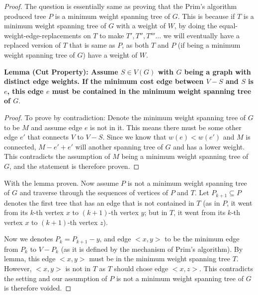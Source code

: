 \documentclass[11pt]{article}
\begin{document}
\begin{proof}

The question is essentially same as proving that the Prim's algorithm produced tree $P$ is a minimum weight spanning tree of $G$. This is because if $T$ is a minimum weight spanning tree of $G$ with a weight of $W$, by doing the equal-weight-edge-replacements on $T$ to make $T', T'', T'''$... we will eventually have a replaced version of $T$ that is same as $P$, as both $T$ and $P$ (if being a minimum weight spanning tree of $G$) have a weight of $W$.

\leavevmode\newline


    \begin{adjustwidth}{1cm}{}

    \textbf{Lemma (Cut Property): Assume $S \in V(G)$ with $G$ being a graph with distinct edge weights. If the minimum cost edge between $V-S$ and $S$ is $e$, this edge $e$ must be contained in the minimum weight spanning tree of $G$}.\newline
    \begin{proof}
    To prove by contradiction: Denote the minimum weight spanning tree of $G$ to be $M$ and assume edge $e$ is not in it. This means there must be some other edge $e'$ that connects $V$ to $V-S$. Since we know that $w(e) < w(e')$ and $M$ is connected, $M - e' + e'$ will another spanning tree of $G$ and has a lower weight. This contradicts the assumption of $M$ being a minimum weight spanning tree of $G$, and the statement is therefore proven.
    \end{proof}
    \end{adjustwidth}

With the lemma proven. Now assume $P$ is not a minimum weight spanning tree of $G$ and traverse through the sequences of vertices of $P$ and $T$. Let $P_{k+1} \subseteq P$ denotes the first tree that has an edge that is not contained in $T$ (as in $P$, it went from its $k$-th vertex $x$ to $(k+1)$-th vertex $y$; but in $T$, it went from its $k$-th vertex $x$ to $(k+1)$-th vertex $z$). \newline

Now we denotes $P_k = P_{k+1} - y$, and edge $<x, y>$ to be the minimum edge from $P_k$ to $V - P_k$ (as it is defined by the mechanism of Prim's algorithm). By lemma, this edge $<x, y>$ must be in the minimum weight spanning tree $T$. However, $<x, y>$ is not in $T$ as $T$ should chose edge $<x, z>$. This contradicts the setting and our assumption of $P$ is not a minimum weight spanning tree of $G$ is therefore voided.


\end{proof}
\end{document}
